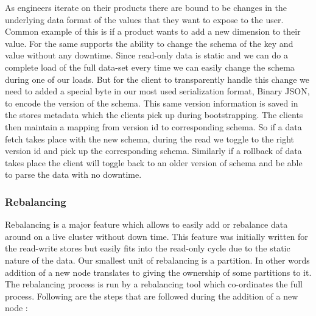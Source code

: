 \documentclass[10pt,twocolumn,preprint,natbib,authoryear]{sigplanconf}
\begin{document}
As engineers iterate on their products there are bound to be changes in the underlying data format of the values that they want to expose to the user. Common example of this is if a product wants to add a new dimension to their value. For the same \projectname{} supports the ability to change the schema of the key and value without any downtime. Since read-only data is static and we can do a complete load of the full data-set every time we can easily change the schema during one of our loads. But for the client to transparently handle this change we need to added a special byte in our most used serialization format, Binary JSON, to encode the version of the schema. This same version information is saved in the stores metadata which the clients pick up during bootstrapping. The clients then maintain a mapping from version id to corresponding schema. So if a data fetch takes place with the new schema, during the read we toggle to the right version id and pick up the corresponding schema. Similarly if a rollback of data takes place the client will toggle back to an older version of schema and be able to parse the data with no downtime. 


\subsubsection{Rebalancing}
\label{sec:read_only:data_cycle:rebalancing}

Rebalancing is a major feature which allows \projectname{} to easily add or rebalance data around on a live cluster without down time. This feature was initially written for the read-write stores but easily fits into the read-only cycle due to the static nature of the data. Our smallest unit of rebalancing is a partition. In other words addition of a new node translates to giving the ownership of some partitions to it. The rebalancing process is run by a rebalancing tool which co-ordinates the full process. Following are the steps that are followed during the addition of a new node :
\end{document}
